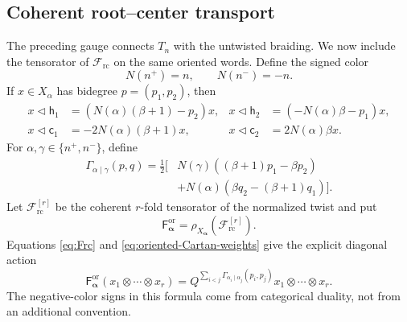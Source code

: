 \documentclass[11pt,a4paper]{article}
\newcommand{\ot}{\otimes}
\newcommand{\tri}{\mathbin{\triangleleft}}
\newcommand{\rc}{\mathrm{rc}}
\theoremstyle{definition}
\theoremstyle{remark}
\begin{document}
\subsection{Coherent root--center transport}
\label{sec:oriented-root-center}

The preceding gauge connects \(T_n\) with the untwisted braiding.  We now
include the tensorator of \(\mathcal F_{\rc}\) on the same oriented words.
Define the signed color
\[
 N(n^+)=n,\qquad N(n^-)=-n.
\]
If \(x\in X_\alpha\) has bidegree \(p=(p_1,p_2)\), then
\begin{equation}\label{eq:oriented-Cartan-weights}
\begin{aligned}
 x\tri\mathsf h_1
 &=(N(\alpha)(\beta+1)-p_2)x,&
 x\tri\mathsf h_2
 &=(-N(\alpha)\beta-p_1)x,\\
 x\tri\mathsf c_1
 &=-2N(\alpha)(\beta+1)x,&
 x\tri\mathsf c_2
 &=2N(\alpha)\beta x.
\end{aligned}
\end{equation}
For \(\alpha,\gamma\in\{n^+,n^-\}\), define
\begin{equation}\label{eq:oriented-F-exponent}
\begin{aligned}
\Gamma_{\alpha\mid\gamma}(p,q)
=\frac12\bigl[
&N(\gamma)((\beta+1)p_1-\beta p_2)\\
&+N(\alpha)(\beta q_2-(\beta+1)q_1)
\bigr].
\end{aligned}
\end{equation}
Let \(\mathcal F_{\rc}^{[r]}\) be the coherent \(r\)-fold tensorator of
the normalized twist and put
\begin{equation}\label{eq:oriented-F-tensorator}
 \mathsf F_{\boldsymbol\alpha}^{\mathrm{or}}
 =
 \rho_{X_{\boldsymbol\alpha}}(\mathcal F_{\rc}^{[r]}).
\end{equation}
Equations \eqref{eq:Frc} and \eqref{eq:oriented-Cartan-weights} give the
explicit diagonal action
\begin{equation}\label{eq:oriented-F-action}
\mathsf F_{\boldsymbol\alpha}^{\mathrm{or}}
(x_1\ot\cdots\ot x_r)
=
Q^{\sum_{i<j}
\Gamma_{\alpha_i\mid\alpha_j}(p_i,p_j)}
x_1\ot\cdots\ot x_r.
\end{equation}
The negative-color signs in this formula come from categorical duality,
not from an additional convention.
\end{document}
